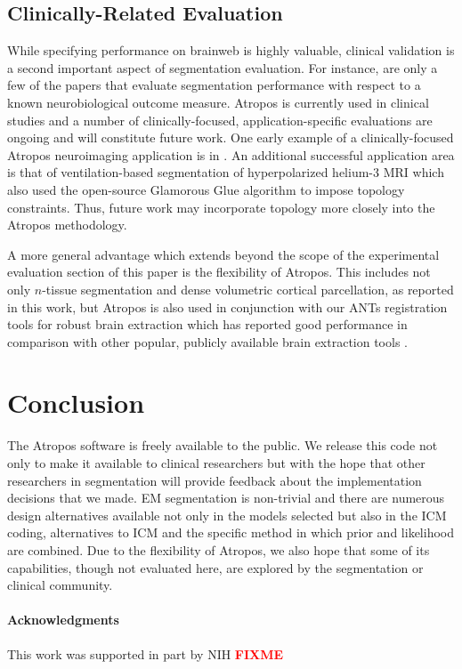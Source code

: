 \documentclass[11pt,english]{article}
\begin{document}
\subsection{Clinically-Related Evaluation}
While specifying performance on brainweb is highly
valuable, clinical validation is a second important aspect of
segmentation evaluation.  For instance, 
\citep{Freeborough1997,Westlye2009,Sanchez-Benavides2010,Chou2009,Bresser2011}
are only a few of the papers that evaluate segmentation performance with
respect to a known neurobiological outcome measure.  Atropos is
currently used in clinical studies and a number of clinically-focused,
application-specific evaluations are ongoing and will constitute
future work.  One early example of a clinically-focused Atropos
neuroimaging application is in \citep{Avants2010c}.  An additional successful
application area is that of ventilation-based segmentation of hyperpolarized helium-3 MRI
\citep{Tustison2010a} which also used the open-source  Glamorous Glue
algorithm to impose topology constraints.  Thus, future work may
incorporate topology more closely into the Atropos methodology.  

A more general advantage which extends beyond the scope of the experimental 
evaluation section of this paper is the flexibility of Atropos.   This includes 
not only $n$-tissue segmentation and dense volumetric cortical parcellation,
as reported in this work, but Atropos is also used in conjunction with our ANTs registration tools for robust
brain extraction which has reported good performance in comparison with other
popular, publicly available brain extraction tools \citep{Avants2010a}.  
 
\section{Conclusion}
The Atropos software is freely available to the public.  We release
this code not only to make it available to clinical researchers but
with the hope that other researchers in segmentation will provide
feedback about the implementation decisions that we made.  EM
segmentation is non-trivial and there are numerous design alternatives
available not only in the models selected but also in the ICM coding, alternatives to ICM and the specific method in which prior
and likelihood are combined.  Due to the flexibility of Atropos, we
also hope that some of its capabilities, though not evaluated here,
are explored by the segmentation or clinical community.


\paragraph{Acknowledgments}
{This work was supported in part by NIH  {\bf {\textcolor{red}{ FIXME}}} }

\newpage


 
\end{document}
